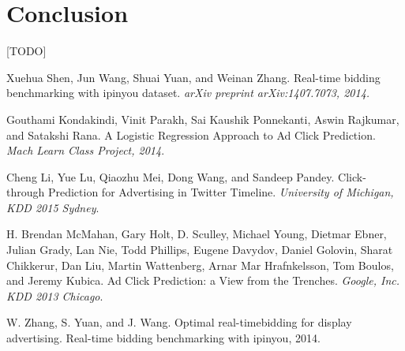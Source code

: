 \documentclass{sig-alternate-05-2015}
\begin{document}
\section{Conclusion}

[TODO]

\begin{thebibliography}{4}
Xuehua Shen, Jun Wang, Shuai Yuan, and Weinan Zhang.
Real-time bidding benchmarking with ipinyou
dataset.
\textit{arXiv preprint arXiv:1407.7073, 2014.}

Gouthami Kondakindi, Vinit Parakh, Sai Kaushik Ponnekanti, Aswin Rajkumar, and Satakshi Rana.
A Logistic Regression Approach to Ad Click
Prediction.
\textit{Mach Learn Class Project, 2014}.

Cheng Li, Yue Lu, Qiaozhu Mei, Dong Wang, and Sandeep Pandey.
Click-through Prediction for Advertising in Twitter Timeline.
\textit{University of Michigan, KDD 2015 Sydney}.

H. Brendan McMahan, Gary Holt, D. Sculley, Michael Young, Dietmar Ebner, Julian Grady, Lan Nie, Todd Phillips, Eugene Davydov, Daniel Golovin, Sharat Chikkerur, Dan Liu, Martin Wattenberg, Arnar Mar Hrafnkelsson, Tom Boulos, and Jeremy Kubica.
Ad Click Prediction: a View from the Trenches.
\textit{Google, Inc. KDD 2013 Chicago}.

W. Zhang, S. Yuan, and J. Wang.
Optimal real-timebidding for display advertising.
Real-time bidding benchmarking with ipinyou, 2014.

\end{thebibliography}
\end{document}

